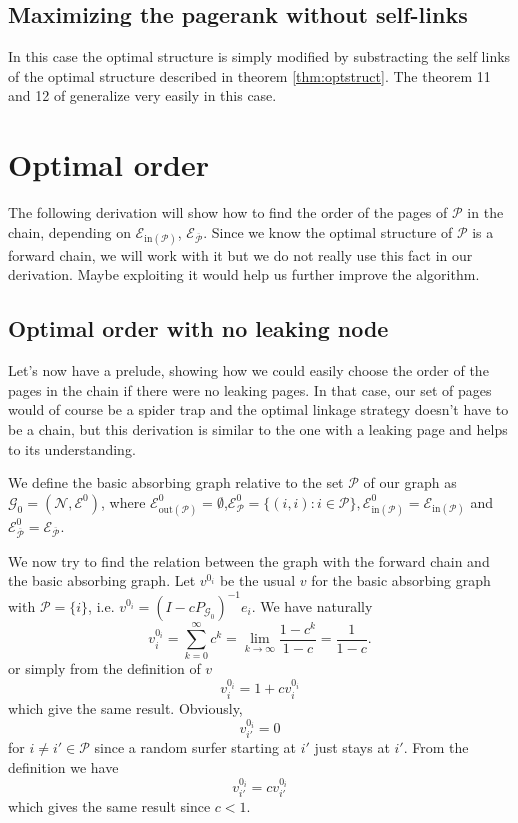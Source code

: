 \documentclass{article}
\newcommand{\1}{\mathbf{1}}
\theoremstyle{definition}
\begin{document}
\subsection{Maximizing the pagerank without self-links}
In this case the optimal structure is simply modified by substracting the self links of the optimal structure described in theorem \ref{thm:optstruct}. The theorem 11 and 12 of \cite{de2008maximizing} generalize very easily in this case.


\section{Optimal order}
The following derivation will show how to find the order of the pages of \(\mathcal{P}\) in the chain, depending
on \(\mathcal{E}_{\text{in}(\mathcal{P})}\), \(\mathcal{E}_{\overline{\mathcal{P}}}\).
Since we know the optimal structure of \(\mathcal{P}\) is a forward chain, we will work with it but
we do not really use this fact in our derivation.
Maybe exploiting it would help us further improve the algorithm.

\subsection{Optimal order with no leaking node}
\label{sec:no_leak}
Let's now have a prelude, showing how we could easily choose the order of the pages in the chain if there were
no leaking pages.
In that case, our set of pages would of course be a spider trap and the optimal linkage strategy doesn't have to be a chain, but this derivation is similar
to the one with a leaking page and helps to its understanding.

We define the basic absorbing graph relative to the set \(\mathcal{P}\) of our graph as \(\mathcal{G}_0=(\mathcal{N},\mathcal{E}^0)\), where \(\mathcal{E}_{\text{out}(\mathcal{P})}^0 = \emptyset\),\(\mathcal{E}^0_{\mathcal{P}}=\{(i,i):i\in \mathcal{P}\},\mathcal{E}_{\text{in}(\mathcal{P})}^0 = \mathcal{E}_{\text{in}(\mathcal{P})}\) and \( \mathcal{E}^0_{\overline{\mathcal{P}}}=\mathcal{E}_{\overline{\mathcal{P}}}\).

We now try to find the relation between the graph with the forward chain and the basic absorbing graph.
Let \(v^{0_i}\) be the usual \(v\) for the basic absorbing graph with \(\mathcal{P} = \{i\}\),
i.e. \(v^{0_i} = (I - cP_{\mathcal{G}_0})^{-1}e_i\).
We have naturally
\[ v_i^{0_i} = \sum_{k=0}^\infty c^k = \lim_{k \to \infty} \frac{1-c^k}{1-c} = \frac{1}{1-c}. \]
or simply from the definition of \(v\)
\[ v_i^{0_i} = 1 + c v_i^{0_i} \]
which give the same result.
Obviously,
\[ v_{i'}^{0_i} = 0 \]
for \(i \neq i' \in \mathcal{P}\) since a random surfer starting at \(i'\) just stays at \(i'\).
From the definition we have
\[ v_{i'}^{0_i} = c v_{i'}^{0_i} \]
which gives the same result since \(c < 1\).
\end{document}
